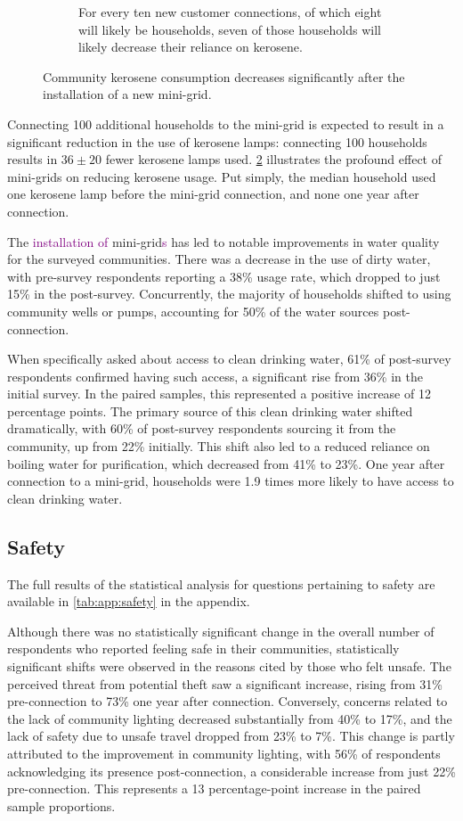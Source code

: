 \begin{figure}[th]
\begin{subfigure}[t]{0.48\textwidth}
		\caption{For every ten new customer connections, of which eight will likely be households, seven of those households will likely decrease their reliance on kerosene.}
		\label{fig:regression-kerosene}
	\end{subfigure}
	\caption{Community kerosene consumption decreases significantly after the installation of a new mini-grid.}
	\label{fig:kerosene}
\end{figure}
Connecting 100 additional households to the mini-grid is expected to result in a significant reduction in the use of kerosene lamps: connecting 100 households results in $36\pm20$ fewer kerosene lamps used. \cref{fig:kerosene} illustrates the profound effect of mini-grids on reducing kerosene usage. Put simply, the median household used one kerosene lamp before the mini-grid connection, and none one year after connection.

The \textcolor{purple}{installation of} mini-grid\textcolor{purple}{s} has led to notable improvements in water quality for the surveyed communities. There was a decrease in the use of dirty water, with pre-survey respondents reporting a 38\% usage rate, which dropped to just 15\% in the post-survey. Concurrently, the majority of households shifted to using community wells or pumps, accounting for 50\% of the water sources post-connection.

When specifically asked about access to clean drinking water, 61\% of post-survey respondents confirmed having such access, a significant rise from 36\% in the initial survey. In the paired samples, this represented a positive increase of 12 percentage points. The primary source of this clean drinking water shifted dramatically, with 60\% of post-survey respondents sourcing it from the community, up from 22\% initially. This shift also led to a reduced reliance on boiling water for purification, which decreased from 41\% to 23\%. One year after connection to a mini-grid, households were 1.9 times more likely to have access to clean drinking water.

\subsection{Safety}
The full results of the statistical analysis for questions pertaining to safety are available in \cref{tab:app:safety} in the appendix.

Although there was no statistically significant change in the overall number of respondents who reported feeling safe in their communities, statistically significant shifts were observed in the reasons cited by those who felt unsafe. The perceived threat from potential theft saw a significant increase, rising from 31\% pre-connection to 73\% one year after connection. Conversely, concerns related to the lack of community lighting decreased substantially from 40\% to 17\%, and the lack of safety due to unsafe travel dropped from 23\% to 7\%. This change is partly attributed to the improvement in community lighting, with 56\% of respondents acknowledging its presence post-connection, a considerable increase from just 22\% pre-connection. This represents a 13 percentage-point increase in the paired sample proportions.

